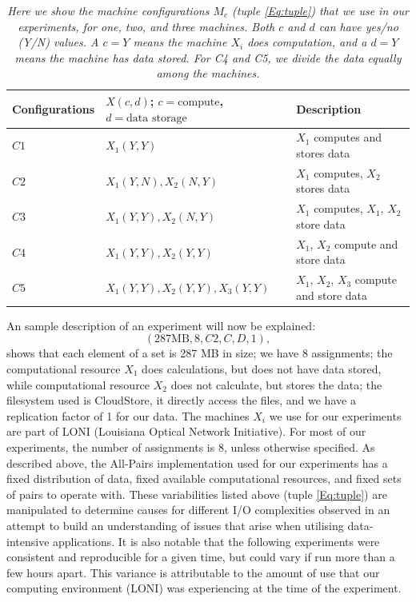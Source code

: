 \documentclass{rspublic}
\begin{document}
\begin{table}
\begin{center}
    \begin{tabular}{ | l | l | l |}
    \hline
    Configurations & $X(c,d)$; $c= \mbox{compute}$, $d=\mbox{data storage}$ & Description  \\ \hline
    $C1$ & $X_1(Y,Y)$  & $X_1$ computes and stores data\\ \hline    
    $C2$ & $X_1(Y,N), X_2(N,Y)$  & $X_1$ computes, $X_2$ stores data \\ \hline
    $C3$ & $X_1(Y,Y), X_2(N,Y)$  & $X_1$ computes, $X_1$, $X_2$ store data \\ \hline
    $C4$ & $X_1(Y,Y), X_2(Y,Y)$  & $X_1$, $X_2$ compute and store data \\ \hline
    $C5$ & $X_1(Y,Y), X_2(Y,Y), X_3(Y,Y)$  & $X_1$, $X_2$, $X_3$ compute and store data \\ 
    \hline
    \end{tabular}
\end{center}
    \caption{\textit{Here we show the machine configurations $M_c$ (tuple
\ref{Eq:tuple}) that we use in our experiments, for one, two, and three
machines. Both $c$ and $d$ can have yes/no (Y/N) values. A $c = Y$ means
the machine $X_i$ does computation, and a $d = Y$ means the machine has
data stored. For C4 and C5, we divide the data equally among the
machines.}}
    \label{Tab:Configs}
\end{table}

An sample description of an experiment will now be explained:
 \begin{equation}
(287 \mbox{MB}, 8, C2, C, D, 1),
\end{equation}
shows that each element of a set is 287 MB in size; we have 8
assignments; the computational resource $X_1$ does calculations, but
does not have data stored, while computational resource $X_2$ does not
calculate, but stores the data; the filesystem used is CloudStore, it
directly access the files, and we have a replication factor of 1 for our
data. The machines $X_i$ we use for our experiments are part of LONI
(Louisiana Optical Network Initiative). For most of our experiments, the
number of assignments is 8, unless otherwise specified.  As described
above, the All-Pairs implementation used for our experiments has a fixed
distribution of data, fixed available computational resources, and fixed
sets of pairs to operate with.  These variabilities listed above (tuple
\ref{Eq:tuple}) are manipulated to determine causes for different
I/O complexities observed in an attempt to build an understanding of
issues that arise when utilising data-intensive applications. It is also
notable that the following experiments were consistent and reproducible
for a given time, but could vary if run more than a few hours apart.
This variance is attributable to the amount of use that our computing
environment (LONI) was experiencing at the time of the experiment.
\end{document}
